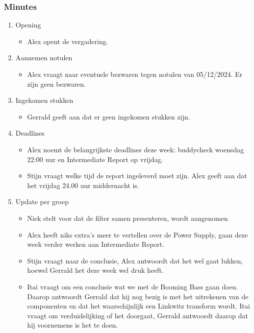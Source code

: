 \subsubsection{\textbf{Minutes}}
\begin{enumerate}
    \item Opening \newline
    \begin{itemize}
        \item Alex opent de vergadering.
    \end{itemize}
    \item Aannemen notulen 
    \begin{itemize}
        \item Alex vraagt naar eventuele bezwaren tegen notulen van 05/12/2024. Er zijn geen bezwaren.
    \end{itemize}
    \item Ingekomen stukken 
    \begin{itemize}
        \item Gerrald geeft aan dat er geen ingekomen stukken zijn.
    \end{itemize}
    \item Deadlines 
    \begin{itemize}
        \item Alex noemt de belangrijkste deadlines deze week: buddycheck woensdag 22:00 uur en Intermediate Report op vrijdag.
        \item Stijn vraagt welke tijd de report ingeleverd moet zijn. Alex geeft aan dat het vrijdag 24.00 uur middernacht is.
    \end{itemize}
    \item Update per groep 
    \begin{itemize}
        \item Niek stelt voor dat de filter samen presenteren, wordt aangenomen
        \item Alex heeft niks extra’s meer te vertellen over de Power Supply, gaan deze week verder werken aan Intermediate Report.
        \item Stijn vraagt naar de conclusie, Alex antwoordt dat het wel gaat lukken, hoewel Gerrald het deze week wel druk heeft.
        \item Itai vraagt om een conclusie wat we met de Booming Bass gaan doen. Daarop antwoordt Gerrald dat hij nog bezig is met het uitrekenen van de componenten en dat het waarschijnlijk een Linkwitz transform wordt. Itai vraagt om verduidelijking of het doorgaat, Gerrald antwoordt daarop dat hij voornemens is het te doen.

\end{itemize}
\end{enumerate}
